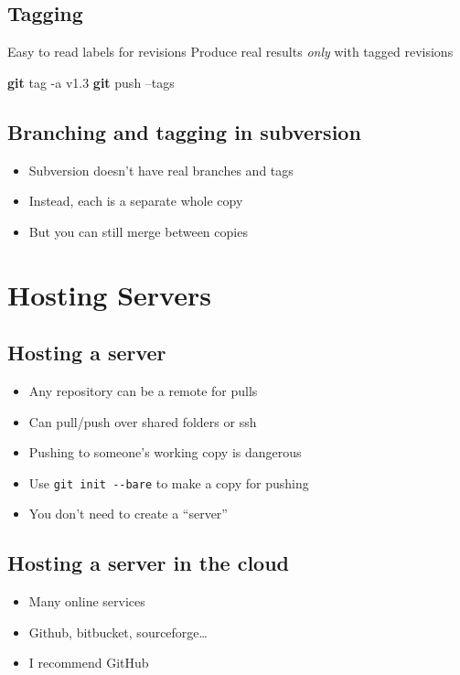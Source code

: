 \documentclass[]{scrartcl}
\newenvironment{Shaded}{}{}
\newcommand{\KeywordTok}[1]{\textcolor[rgb]{0.00,0.44,0.13}{\textbf{{#1}}}}
\newcommand{\NormalTok}[1]{{#1}}
\begin{document}
\subsection{Tagging}\label{tagging}

Easy to read labels for revisions Produce real results \emph{only} with
tagged revisions

\begin{Shaded}
\begin{Highlighting}[]
\KeywordTok{git} \NormalTok{tag -a v1.3}
\KeywordTok{git} \NormalTok{push --tags}
\end{Highlighting}
\end{Shaded}

\subsection{Branching and tagging in
subversion}\label{branching-and-tagging-in-subversion}

\begin{itemize}
\itemsep1pt\parskip0pt
\item
  Subversion doesn't have real branches and tags
\item
  Instead, each is a separate whole copy
\item
  But you can still merge between copies
\end{itemize}

\section{Hosting Servers}\label{hosting-servers}

\subsection{Hosting a server}\label{hosting-a-server}

\begin{itemize}
\itemsep1pt\parskip0pt
\item
  Any repository can be a remote for pulls
\item
  Can pull/push over shared folders or ssh
\item
  Pushing to someone's working copy is dangerous
\item
  Use \texttt{git init -{}-bare} to make a copy for pushing
\item
  You don't need to create a ``server''
\end{itemize}

\subsection{Hosting a server in the
cloud}\label{hosting-a-server-in-the-cloud}

\begin{itemize}
\itemsep1pt\parskip0pt
\item
  Many online services
\item
  Github, bitbucket, sourceforge\ldots{}
\item
  I recommend GitHub
\end{itemize}
\end{document}
